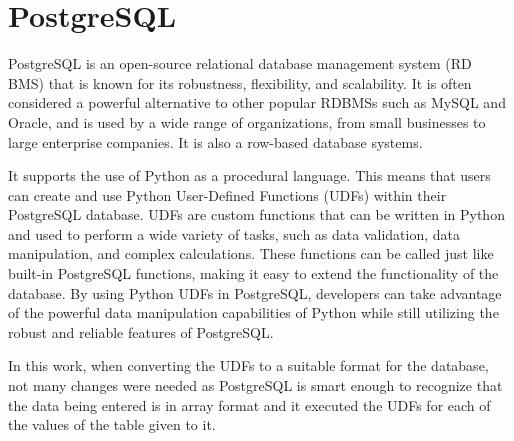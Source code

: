 \section{PostgreSQL}
\label{sec:postgres}


PostgreSQL is an open-source relational database management system (RD BMS) that is known for its robustness, flexibility, and scalability. It is often considered a powerful alternative to other popular RDBMSs such as MySQL and Oracle, and is used by a wide range of organizations, from small businesses to large enterprise companies. It is also a row-based database systems.

It supports the use of Python as a procedural language. This means that users can create and use Python User-Defined Functions (UDFs) within their PostgreSQL database. UDFs are custom functions that can be written in Python and used to perform a wide variety of tasks, such as data validation, data manipulation, and complex calculations. These functions can be called just like built-in PostgreSQL functions, making it easy to extend the functionality of the database. By using Python UDFs in PostgreSQL, developers can take advantage of the powerful data manipulation capabilities of Python while still utilizing the robust and reliable features of PostgreSQL.

In this work, when converting the UDFs to a suitable format for the database, not many changes were needed as PostgreSQL is smart enough to recognize that the data being entered is in array format and it executed the UDFs for each of the values of the table given to it.